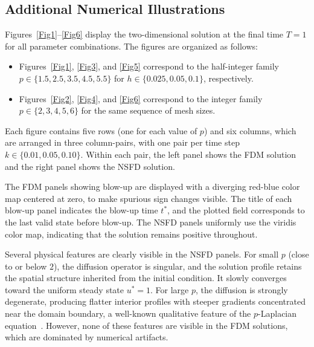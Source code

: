 \documentclass[final,12pt,3p]{elsarticle}
\theoremstyle{plain}
\theoremstyle{definition}
\theoremstyle{remark}
\begin{document}
\begin{appendices}
\section{Additional Numerical Illustrations}\label{App1}

Figures~\ref{Fig1}--\ref{Fig6} display the two-dimensional solution at the 
final time $T=1$ for all parameter combinations.
The figures are organized as follows:
\begin{itemize}
\item Figures~\ref{Fig1}, \ref{Fig3}, and \ref{Fig5} correspond to the half-integer family $p \in \{1.5, 2.5, 3.5, 4.5, 5.5\}$ for $h \in \{0.025, 0.05, 0.1\}$, respectively.
%
\item Figures~\ref{Fig2}, \ref{Fig4}, and \ref{Fig6} correspond to the integer family $p \in \{2, 3, 4, 5, 6\}$ for the same sequence of mesh sizes.
\end{itemize}
Each figure contains five rows (one for each value of $p$) and six columns, which are arranged in three column-pairs, with one pair per time step $k \in \{0.01, 0.05, 0.10\}$. Within each pair, the left panel shows the FDM solution and the right panel shows the NSFD solution.

The FDM panels showing blow-up are displayed with a diverging red-blue color map centered at zero, to make spurious sign changes visible.
The title of each blow-up panel indicates the blow-up time $t^*$, and the plotted field corresponds to the last valid state before blow-up.
The NSFD panels uniformly use the viridis color map, indicating that the solution remains positive throughout.

Several physical features are clearly visible in the NSFD panels.
For small $p$ (close to or below $2$), the diffusion operator is singular, and the solution profile retains the spatial structure inherited from the initial condition. It slowly converges toward the uniform steady state $u^* = 1$.
For large $p$, the diffusion is strongly degenerate, producing flatter interior profiles with steeper gradients concentrated near the domain boundary, a well-known qualitative feature of the $p$-Laplacian equation~\cite{Lindqvist2019}.
However, none of these features are visible in the FDM solutions, which are dominated by numerical artifacts.


\end{appendices}
\end{document}
